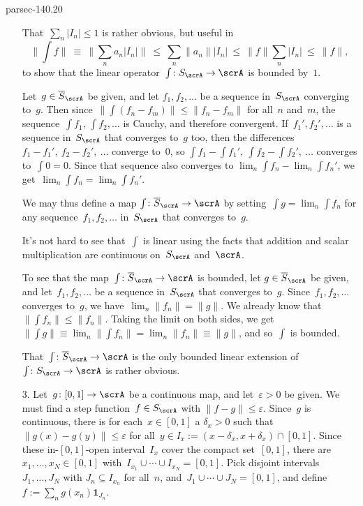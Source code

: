 \documentclass[b5page]{book}
\begin{document}
\begin{solution}{parsec-140.20}
\begin{enumerate}
That~$\sum_n\left|I_n\right| \leq 1$ is rather obvious,
but useful in
\begin{equation*}
    \textstyle
    \|\int f \|
\ \equiv\  \|\sum_n a_n \left|I_n\right| \|
\ \leq\  \sum_n \|a_n\| \left|I_n\right|
\ \leq\  \|f\| \sum_n \left|I_n\right|
\ \leq\  \|f\|,
\end{equation*}
to show that the linear operator~$\int\colon S_\scrA\to \scrA$
is bounded by~$1$.

Let~$g\in \overline{S}_\scrA$ be given,
and let
$f_1,f_2,\dotsc$ be a sequence in~$S_\scrA$ converging
to~$g$.
Then since~$\|\int (f_n-f_m)\|\leq \|f_n-f_m\|$
for all~$n$ and~$m$,
the sequence~$\int f_1, \,\int f_2,\dotsc$
is Cauchy,
and therefore convergent.
If~$f_1',f_2',\dotsc$ is a sequence in~$S_\scrA$
that converges to~$g$ too,
then the differences $f_1-f_1',\ f_2-f_2',\ \dotsc$
converge to~$0$,
so $\int f_1 - \int f_1',\ \int f_2-\int f_2',\ \dotsc$
converges to~$\int 0 = 0$.
Since that sequence also converges to
$\lim_n \int f_n - \lim_n \int f_n'$,
we
get~$\lim_n \int f_n = \lim_n \int f_n'$.

We may thus define a map $\int\colon \overline{S}_\scrA \to\scrA$
by setting~$\int g = \lim_n \int f_n$
for any sequence~$f_1,f_2,\dotsc $ in~$S_\scrA$
that converges to~$g$.

It's not hard to see that~$\int$ is linear
using the facts that addition and scalar multiplication
are continuous on~$S_\scrA$ and~$\scrA$.

To see that the map~$\int\colon \overline{S}_\scrA\to\scrA$
is bounded,
let $g\in\overline{S}_\scrA$ be given,
and let~$f_1,f_2,\dotsc$ be a sequence in~$S_\scrA$
that converges to~$g$.
Since~$f_1,f_2,\dotsc$ converges to~$g$,
we have~$\lim_n \|f_n\| = \|g\|$.
We already know that~$\| \int f_n \| \leq \|f_n\|$.
Taking the limit on both sides, we get
$\|\int g\| \equiv \lim_n \|\int f_n\| = \lim_n \|f_n\| \equiv
\|g\|$,
and so~$\int$ is bounded.

That~$\int\colon \overline{S}_\scrA\to \scrA$
is the only bounded linear extension of~$\int\colon S_\scrA\to\scrA$
is rather obvious.

\item[3.]
Let~$g\colon [0,1]\to\scrA$
be a continuous map,
and let~$\varepsilon>0$ be given.
We must find a step function~$f\in S_\scrA$
with $\|f-g\|\leq \varepsilon$.
Since~$g$ is continuous,
there is
for each~$x\in [0,1]$
a $\delta_x>0$
such that $\|g(x)-g(y)\|\leq \varepsilon$
for all~$y\in I_x:=(x-\delta_x,x+\delta_x)\cap[0,1]$.
Since these in-$[0,1]$-open interval~$I_x$
cover the compact set~$[0,1]$,
there are~$x_1,\dotsc,x_N\in [0,1]$
with~$I_{x_1}\cup \dotsb\cup I_{x_N} = [0,1]$.
Pick disjoint intervals~$J_1,\dotsc,J_N$
with $J_n\subseteq I_{x_n}$ for all~$n$,
and~$J_1\cup \dotsb\cup J_N=[0,1]$,
and define $f:= \sum_n g(x_n) \mathbf{1}_{J_n}$.


\end{enumerate}
\end{solution}
\end{document}
